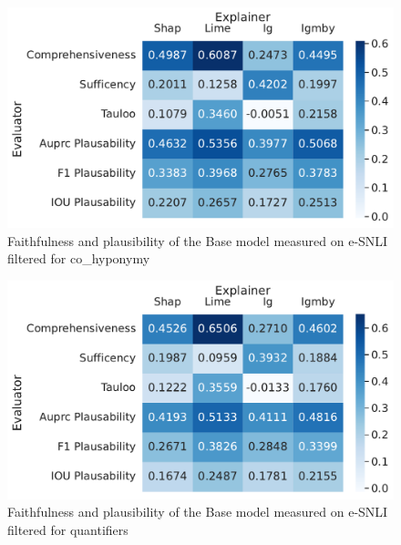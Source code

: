 \begin{figure}[h!]
    \centering
    \includegraphics[width=\textwidth]{./images/ferret_heatmaps_phenomena/default_mnli/co_hyponym.pdf}
    \caption{Faithfulness and plausibility of the Base model measured on \acs{e-SNLI} filtered for co\_hyponymy}
    \label{fig:ferret-mnli-co-hyponym}
\end{figure}

\begin{figure}[h!]
    \centering
    \includegraphics[width=\textwidth]{./images/ferret_heatmaps_phenomena/default_mnli/quantifiers.pdf}
    \caption{Faithfulness and plausibility of the Base model measured on \acs{e-SNLI} filtered for quantifiers}
    \label{fig:ferret-mnli-quantifiers}
\end{figure}

